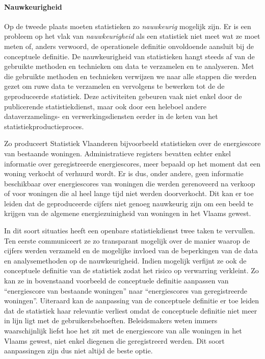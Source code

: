 \documentclass[\mainfiledir/00_handleiding_statistiekproductie.tex]{subfiles}
\begin{document}
\paragraph{Nauwkeurigheid}

Op de tweede plaats moeten statistieken zo \emph{nauwkeurig} mogelijk zijn. Er is een probleem op het vlak van \emph{nauwkeurigheid} als een statistiek niet meet wat ze moet meten of, anders verwoord, de operationele definitie onvoldoende aansluit bij de conceptuele definitie. De nauwkeurigheid van statistieken hangt steeds af van de gebruikte methoden en technieken om data te verzamelen en te analyseren. Met die gebruikte methoden en technieken verwijzen we naar alle stappen die werden gezet om ruwe data te verzamelen en vervolgens te bewerken tot de de geproduceerde statistiek. Deze activiteiten gebeuren vaak niet enkel door de publicerende statistiekdienst, maar ook door een heleboel andere dataverzamelings- en verwerkingsdiensten eerder in de keten van het statistiekproductieproces. 

Zo produceert Statistiek Vlaanderen bijvoorbeeld statistieken over de energiescore van bestaande woningen. Administratieve registers bevatten echter enkel informatie over geregistreerde energiescores, meer bepaald op het moment dat een woning verkocht of verhuurd wordt. Er is dus, onder andere, geen informatie beschikbaar over energiescores van woningen die werden gerenoveerd na verkoop of voor woningen die al heel lange tijd niet werden doorverkocht. Dit kan er toe leiden dat de geproduceerde cijfers niet genoeg nauwkeurig zijn om een beeld te krijgen van de algemene energiezuinigheid van woningen in het Vlaams gewest.

In dit soort situaties heeft een openbare statistiekdienst twee taken te vervullen. Ten eerste communiceert ze zo transparant mogelijk over de manier waarop de cijfers werden verzameld en de mogelijke invloed van de beperkingen van de data en analysemethoden op de nauwkeurigheid. Indien mogelijk verfijnt ze ook de conceptuele definitie van de statistiek zodat het risico op verwarring verkleint. Zo kan ze in bovenstaand voorbeeld de conceptuele definitie aanpassen van ``energiescore van bestaande woningen'' naar ``energiescores van geregistreerde woningen''. Uiteraard kan de aanpassing van de conceptuele definitie er toe leiden dat de statistiek haar relevantie verliest omdat de conceptuele definitie niet meer in lijn ligt met de gebruikersbehoeften. Beleidsmakers weten immers waarschijnlijk liefst hoe het zit met de energiescore van alle woningen in het Vlaams gewest, niet enkel diegenen die geregistreerd werden. Dit soort aanpassingen zijn dus niet altijd de beste optie.
\end{document}
